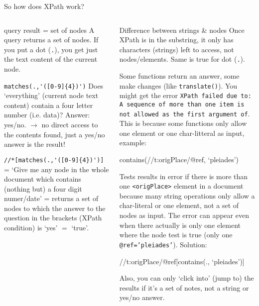 \begin{frame}{So how does XPath work?}

\begin{columns}
\begin{block}{query result = set of nodes}\footnotesize
A query returns a set of nodes. If you put a dot (\texttt{.}), you get just the text content of the current node.\smallskip

\scriptsize
\verb|matches(.,'([0-9]{4})')| Does `everything' (current node text content) contain a four letter number (i.e. data)? Answer: yes/no. 
$\to$ no direct access to the contents found, just a yes/no answer is the result!\smallskip
 
\verb|//*[matches(.,'([0-9]{4})')]| = `Give me any node in the whole document which contains (nothing but) a four digit numer/date' = returns a set of nodes to which the answer to the question in the brackets (XPath condition) is `yes' $=$ `true'. 
\end{block}

\begin{block}{Difference between strings \& nodes}\scriptsize
Once XPath is in the substring, it only has characters (strings) left to access, not nodes/elements. Same is true for dot (\texttt{.}).

Some functions return an answer, some make changes (like \texttt{translate()}). You might get the error \texttt{XPath failed due to: A sequence of more than one item is not allowed as the first argument of}. This is because some functions only allow one element or one char-litteral as input, example:

\begin{xmlcode}
contains(//t:origPlace/@ref, ‘pleiades’)
\end{xmlcode}
Tests results in error if there is more than one \texttt{<origPlace>} element in a document because many string operations only allow a char-literal or
one element, not a set of nodes as input. The error can appear even when there actually is only one element where the node test is true (only one \texttt{@ref=’pleiades’}). Solution: 
\begin{xmlcode}
//t:origPlace/@ref[contains(., ‘pleiades’)]
\end{xmlcode}

Also, you can only `click into' (jump to) the results if it's a set of notes, not a string or yes/no answer.
\end{block}
\end{columns}


\end{frame}
